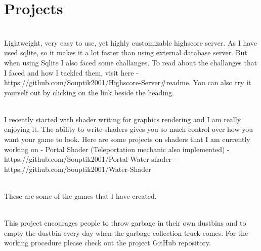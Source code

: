 \documentclass[]{deedy-resume-openfont}
\begin{document}
       \section{Projects}
       \raggedright
         
          
           
           
           
           \hfill {}\\
           Lightweight, very easy to use, yet highly customizable highscore server. As I have used sqlite, so it makes it a lot faster than using external database server. But when using Sqlite I also faced some challanges. To read about the challanges that I faced and how I tackled them, visit here - https://github.com/Souptik2001/Highscore-Server\#readme. You can also try it yourself out by clicking on the link beside the heading.\\
           \sectionsep

         
           \hfill {}\\
           I recently started with shader writing for graphics rendering and I am really enjoying it. The ability to write shaders gives you so much control over how you want your game to look. Here are some projects on shaders that I am currently working on - Portal Shader (Teleportation mechanic also implemented) - https://github.com/Souptik2001/Portal
Water shader - https://github.com/Souptik2001/Water-Shader\\
           \sectionsep



           \hfill {}\\
           These are some of the games that I have created.\\
           \sectionsep



       
           \hfill {}\\
           This project encourages people to throw garbage in their own dustbins and to empty the dustbin every day when the garbage collection truck comes. For the working procedure please check out the project GitHub repository.\\
           \sectionsep
         
\end{document}
